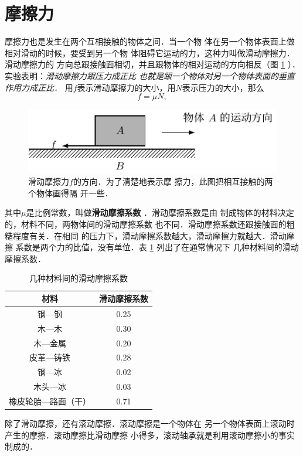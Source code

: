 \section{摩擦力} 
    摩擦力也是发生在两个互相接触的物体之间．当一个物
体在另一个物体表面上做相对滑动的时候，要受到另一个物
体阻碍它运动的力，这种力叫做滑动摩擦力．滑动摩擦力的
方向总跟接触面相切，并且跟物体的相对运动的方向相反（图
 \ref{fig_A_1-12} ）．实验表明：\textit{滑动摩擦力跟压力成正比
也就是跟一个物体对另一个物体表面的垂直作用力成正比．} 
用$f$表示滑动摩擦力的大小，用$N$表示压力的大小，那么
\[f=\mu N,\]
\begin{figure} [htp]\centering
\includegraphics{fig/A/1-12.pdf} 
\caption{滑动摩擦力$f$的方向．为了清楚地表示摩
擦力，此图把相互接触的两个物体画得隔
开一些．
} \label{fig_A_1-12} 
\end{figure} 
其中$\mu$是比例常数，叫做\textbf{滑动摩擦系数} ．滑动摩擦系数是由
制成物体的材料决定的，材料不同，两物体间的滑动摩擦系数
也不同．滑动摩擦系数还跟接触面的粗糙程度有关．在相同
的压力下，滑动摩擦系数越大，滑动摩擦力就越大．滑动摩擦
系数是两个力的比值，没有单位．表 \ref{tab_A_1-1} 列出了在通常情况下
几种材料间的滑动摩擦系数．

\begin{table} [htp]\centering
\caption{几种材料间的滑动摩擦系数} \label{tab_A_1-1} 
\begin{tabular} {cc} 
\hline
材料   &  滑动摩擦系数\\
\hline
钢—钢     & 0.25 \\
木—木   & 0.30 \\
木—金属   &  0.20\\
皮革—铸铁   &  0.28\\
钢—冰   &  0.02\\
木头—冰   &  0.03\\
橡皮轮胎—路面（干）   &  0.71\\
\hline
\end{tabular} 
\end{table} 

    除了滑动摩擦，还有滚动摩擦．滚动摩擦是一个物体在
另一个物体表面上滚动时产生的摩擦．滚动摩擦比滑动摩擦
小得多，滚动轴承就是利用滚动摩擦小的事实制成的．

